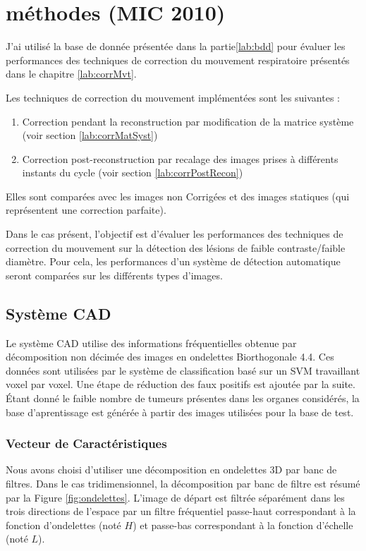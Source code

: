 \chapter{méthodes (MIC 2010)}

J'ai utilisé la base de donnée présentée dans la partie\ref{lab:bdd} pour évaluer les performances des techniques de correction du mouvement respiratoire présentés dans le chapitre \ref{lab:corrMvt}. 

Les techniques de correction du mouvement implémentées sont les suivantes :

\begin{enumerate}
 \item Correction pendant la reconstruction par modification de la matrice système (voir section \ref{lab:corrMatSyst})
 \item Correction post-reconstruction par recalage des images prises à différents instants du cycle (voir section \ref{lab:corrPostRecon})
\end{enumerate}

Elles sont comparées avec les images non Corrigées et des images statiques (qui représentent une correction parfaite).

Dans le cas présent, l'objectif est d'évaluer les performances des techniques de correction du mouvement sur la détection des lésions de faible contraste/faible diamètre. Pour cela, les performances d'un système de détection automatique seront comparées sur les différents types d'images.

\section{Système CAD}

Le système CAD utilise des informations fréquentielles obtenue par décomposition non décimée des images en ondelettes Biorthogonale 4.4. Ces données sont utilisées par le système de classification basé sur un SVM travaillant voxel par voxel. Une étape de réduction des faux positifs est ajoutée par la suite.
\'Etant donné le faible nombre de tumeurs présentes dans les organes considérés, la base d'aprentissage est générée à partir des images utilisées pour la base de test. 

\subsection{Vecteur de Caractéristiques}

Nous avons choisi d’utiliser une décomposition en ondelettes 3D par banc de filtres. Dans le cas tridimensionnel, la décomposition par banc de filtre est résumé par la Figure \ref{fig:ondelettes}. L’image de départ est filtrée séparément dans les trois directions de l’espace par un filtre fréquentiel passe-haut correspondant à la fonction d’ondelettes (noté $H$) et passe-bas correspondant à la fonction d’échelle (noté $L$). 

